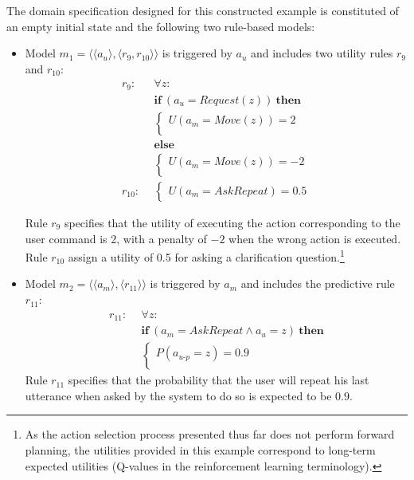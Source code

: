 The domain specification designed for this constructed example is constituted of an empty initial state and the following two rule-based models: \begin{itemize}
\item Model $m_1 = \langle \langle a_u \rangle, \langle r_9, r_{10} \rangle \rangle$ is triggered by $a_u$ and includes two utility rules $r_{9}$ and $r_{10}$:
\begin{align*}
r_{9}: \ \ & \forall z: \\ 
& \textbf{if} \ (a_u = Request(z)) \ \textbf{then} \\ 
& \begin{cases} 
U(a_m = Move(z)) = 2 \\ 
\end{cases} \\
& \textbf{else} \\ 
& \begin{cases} 
U(a_m = Move(z)) = -2 \\ 
\end{cases} \\[4mm]
r_{10}: \ \ &  \begin{cases} U(a_m = \mathit{AskRepeat}) = 0.5 \end{cases}
\end{align*}

Rule $r_{9}$ specifies that the utility of executing the action corresponding to the user command is 2, with a penalty of $-2$ when the wrong action is executed. Rule $r_{10}$ assign a utility of 0.5 for asking a clarification question.\footnote{As the action selection process presented thus far does not perform forward planning, the utilities provided in this example correspond to long-term expected utilities (Q-values in the reinforcement learning terminology).}

\item Model $m_2 = \langle \langle a_m \rangle, \langle r_{11} \rangle \rangle$ is triggered by $a_m$ and includes the predictive rule $r_{11}$: 
\begin{align*}
r_{11}: \ \ & \forall z: \\ 
& \textbf{if} \ (a_m = \mathit{AskRepeat} \land a_u=z) \ \textbf{then} \\ 
& \begin{cases} 
P(a_{u\mbox{-}p} = z) = 0.9 \\ 
\end{cases}
\end{align*}
Rule $r_{11}$ specifies that the probability that the user will repeat his last utterance when asked by the system to do so is expected to be $0.9$.
\end{itemize}

